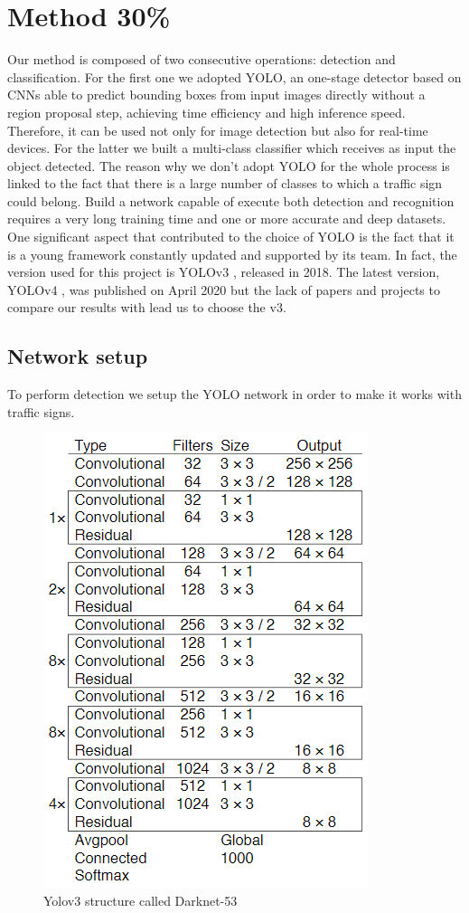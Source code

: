 \section{Method 30\%}
Our method is composed of two consecutive operations: detection and classification. For the first one we adopted YOLO, an one-stage detector based on CNNs able to predict bounding boxes from input images directly without a region proposal step, achieving time efficiency and high inference speed. Therefore, it can be used not only for image detection but also for real-time devices. For the latter we built a multi-class classifier which receives as input the object detected. The reason why we don't adopt YOLO for the whole process is linked to the fact that there is a large number of classes to which a traffic sign could belong. Build a network capable of execute both detection and recognition requires a very long training time and one or more accurate and deep datasets.\\ 
One significant aspect that contributed to the choice of YOLO is the fact that it is a young framework constantly updated and supported by its team. In fact, the version used for this project is YOLOv3 \cite{yolov3}, released in 2018. The latest version, YOLOv4 \cite{yolov4}, was published on April 2020 but the lack of papers and projects to compare our results with lead us to choose the v3. 

\subsection{Network setup}
To perform detection we setup the YOLO network in order to make it works with traffic signs.
\begin{figure}[h]
	\includegraphics[scale=0.8]{Res/Immagini/darknet53.PNG}	
	\caption{Yolov3 structure called Darknet-53}
\end{figure}

